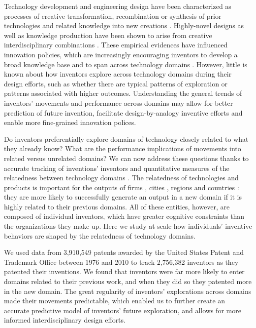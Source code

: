 \documentclass{dsj}
\begin{document}
Technology development and engineering design have been characterized as processes of creative transformation, recombination or synthesis of prior technologies and related knowledge into new creations \cite{Fu2013, Weisberg2006, Arthur2009, Hatchuel2009, Tang2013}. Highly-novel designs as well as knowledge production have been shown to arise from creative interdisciplinary combinations \cite{Reich2012, Fleming2001, Nooteboom2007, Arthur2009, Uzzi2013, Kim2016}. These empirical evidences have influenced innovation policies, which are increasingly encouraging inventors to develop a broad knowledge base and to span across technology domains \cite{Clough2004, Olson2013,EURAB2004}. However, little is known about how inventors explore across technology domains during their design efforts, such as whether there are typical patterns of exploration or patterns associated with higher outcomes. Understanding the general trends of inventors' movements and performance across domains may allow for better prediction of future invention, facilitate design-by-analogy inventive efforts \cite{Linsey2007, Linsey2012, McAdams2002} and enable more fine-grained innovation polices.


Do inventors preferentially explore domains of technology closely related to what they already know? What are the performance implications of movements into related versus unrelated domains? We can now address these questions thanks to accurate tracking of inventions' inventors \cite{Li2014} and quantitative measures of the relatedness between technology domains \cite{Alstott2017, Kay2014, Leydesdorff2014, Verspagen1997}. The relatedness of technologies and products is important for the outputs of firms \cite{Neffke2013, Bottazzi2010, Leten2007, Breschi2003}, cities \cite{Rigby2013}, regions \cite{Castaldi2015, Neffke2011, Frenken2007} and countries \cite{Hidalgo2007}: they are more likely to successfully generate an output in a new domain if it is highly related to their previous domains.
All of these entities, however, are composed of individual inventors, which have greater cognitive constraints than the organizations they make up. Here we study at scale how individuals' inventive behaviors are shaped by the relatedness of technology domains. 


We used data from 3,910,549 patents awarded by the United States Patent and Trademark Office between 1976 and 2010 to track 2,756,382 inventors as they patented their inventions. We found that inventors were far more likely to enter domains related to their previous work, and when they did so they patented more in the new domain. The great regularity of inventors' explorations across domains made their movements predictable, which enabled us to further create an accurate predictive model of inventors' future exploration, and allows for more informed interdisciplinary design efforts.
\end{document}

